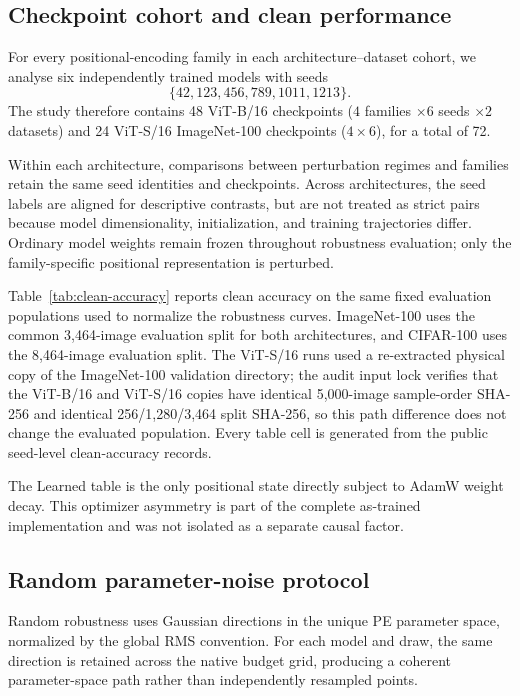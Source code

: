 \documentclass[preprint,12pt,authoryear]{elsarticle}
\begin{document}
\subsection{Checkpoint cohort and clean performance}

For every positional-encoding family in each architecture--dataset
cohort, we analyse six independently trained models with seeds
\[
\{42,123,456,789,1011,1213\}.
\]
The study therefore contains 48 ViT-B/16 checkpoints
($4$ families $\times 6$ seeds $\times 2$ datasets) and 24 ViT-S/16
ImageNet-100 checkpoints ($4\times6$), for a total of 72.

Within each architecture, comparisons between perturbation regimes and
families retain the same seed identities and checkpoints. Across
architectures, the seed labels are aligned for descriptive contrasts,
but are not treated as strict pairs because model dimensionality,
initialization, and training trajectories differ. Ordinary model weights
remain frozen throughout robustness evaluation; only the family-specific
positional representation is perturbed.

Table~\ref{tab:clean-accuracy} reports clean accuracy on the same fixed
evaluation populations used to normalize the robustness curves. ImageNet-100
uses the common 3,464-image evaluation split for both architectures, and
CIFAR-100 uses the 8,464-image evaluation split. The ViT-S/16 runs used a
re-extracted physical copy of the ImageNet-100 validation directory; the audit
input lock verifies that the ViT-B/16 and ViT-S/16 copies have identical
5,000-image sample-order SHA-256 and identical 256/1,280/3,464 split SHA-256,
so this path difference does not change the evaluated population. Every table
cell is generated from the public seed-level clean-accuracy records.



The Learned table is the only positional state directly subject to AdamW
weight decay. This optimizer asymmetry is part of the complete as-trained
implementation and was not isolated as a separate causal factor.

\subsection{Random parameter-noise protocol}

Random robustness uses Gaussian directions in the unique PE parameter
space, normalized by the global RMS convention. For each model and draw,
the same direction is retained across the native budget grid, producing a
coherent parameter-space path rather than independently resampled points.
\end{document}

